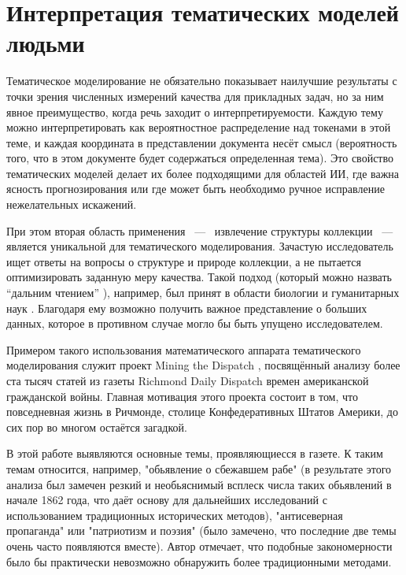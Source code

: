 \section{Интерпретация тематических моделей людьми}

Тематическое моделирование не обязательно показывает наилучшие результаты с точки зрения численных измерений качества для прикладных задач, но за ним явное преимущество, когда речь заходит о интерпретируемости. Каждую тему можно интерпретировать как вероятностное распределение над токенами в этой теме, и каждая координата в представлении документа несёт смысл (вероятность того, что в этом документе будет содержаться определенная тема). Это свойство тематических моделей делает их более подходящими для областей ИИ, где важна ясность прогнозирования или где может быть необходимо ручное исправление нежелательных искажений.

При этом вторая область применения ~---~ извлечение структуры коллекции ~---~ является уникальной для тематического моделирования. Зачастую исследователь ищет ответы на вопросы о структуре и природе коллекции, а не пытается оптимизировать заданную меру качества. Такой подход (который можно назвать ``дальним чтением'' \cite{milkova2019distant}), например, был принят в области биологии \cite{Liu2016,funnell2019integrated} и гуманитарных наук \cite{fntir2017applications,antons2019content}. Благодаря ему возможно получить важное представление о больших данных, которое в противном случае могло бы быть упущено исследователем.

Примером такого использования математического аппарата тематического моделирования служит проект  Mining the Dispatch \cite{monsters_men,dispatch}, посвящённый анализу более ста тысяч статей из газеты Richmond Daily Dispatch времен американской гражданской войны. Главная мотивация этого проекта состоит в том, что повседневная жизнь в Ричмонде, столице Конфедеративных Штатов Америки, до сих пор во многом остаётся загадкой.

В этой работе выявляются основные темы, проявляющиесся в газете. К таким темам относится, например, "обьявление о сбежавшем рабе" (в результате этого анализа был замечен резкий и необьяснимый всплеск числа таких обьявлений в начале 1862 года, что даёт основу для дальнейших исследований с использованием традиционных исторических методов), "антисеверная пропаганда" или "патриотизм и поэзия" (было замечено, что последние две темы очень часто появляются вместе). Автор отмечает, что подобные закономерности было бы практически невозможно обнаружить более традиционными методами.


